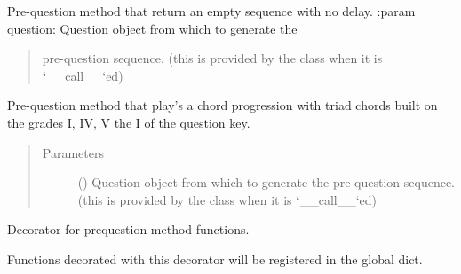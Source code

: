 \documentclass[letterpaper,10pt,english]{sphinxmanual}
\begin{document}

\begin{fulllineitems}
\label{\detokenize{index:birdears.prequestion.none}}
Pre-question method that return an empty sequence with no delay.
:param question: Question object from which to generate the
\begin{quote}

pre-question sequence. (this is provided by the  class
when it is {\color{red}\bfseries{}{}`}\_\_call\_\_{}`ed)
\end{quote}
\begin{quote}\begin{description}
\end{description}\end{quote}

\end{fulllineitems}


\begin{fulllineitems}
\label{\detokenize{index:birdears.prequestion.progression_i_iv_v_i}}
Pre-question method that play’s a chord progression with triad chords built
on the grades I, IV, V the I of the question key.
\begin{quote}\begin{description}
\item[{Parameters}] \leavevmode
{} () \textendash{} Question object from which to generate the
pre-question sequence. (this is provided by the  class
when it is {\color{red}\bfseries{}{}`}\_\_call\_\_{}`ed)

\end{description}\end{quote}

\end{fulllineitems}


\begin{fulllineitems}
\label{\detokenize{index:birdears.prequestion.register_prequestion_method}}
Decorator for prequestion method functions.

Functions decorated with this decorator will be registered in the
 global dict.

\end{fulllineitems}
\end{document}
